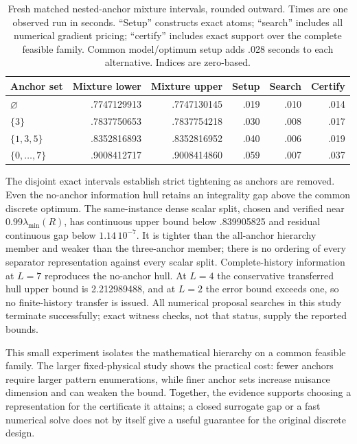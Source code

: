 \begin{table}[htbp]
\centering\small
\caption{Fresh matched nested-anchor mixture intervals, rounded outward.
Times are one observed run in seconds. ``Setup'' constructs exact atoms;
``search'' includes all numerical gradient pricing; ``certify'' includes exact
support over the complete feasible family. Common model/optimum setup adds
.028 seconds to each alternative. Indices are zero-based.}
\label{tab:nested-fresh}
\begin{tabular}{lrrrrr}
\toprule
Anchor set & Mixture lower & Mixture upper & Setup & Search & Certify\\
\midrule
$\varnothing$ & .7747129913 & .7747130145 & .019 & .010 & .014\\
$\{3\}$ & .7837750653 & .7837754218 & .030 & .008 & .017\\
$\{1,3,5\}$ & .8352816893 & .8352816952 & .040 & .006 & .019\\
$\{0,\ldots,7\}$ & .9008412717 & .9008414860 & .059 & .007 & .037\\
\bottomrule
\end{tabular}
\end{table}

The disjoint exact intervals establish strict tightening as anchors are removed.
Even the no-anchor information hull retains an integrality gap above the
common discrete optimum. The same-instance dense scalar split, chosen and
verified near $0.99\lambda_{\min}(R)$, has continuous upper bound below
.839905825 and residual continuous gap below $1.14\,10^{-7}$. It is tighter
than the all-anchor hierarchy member and weaker than the three-anchor member;
there is no ordering of every separator representation against every scalar
split. Complete-history information at $L=7$ reproduces the no-anchor hull.
At $L=4$ the conservative transferred hull upper bound is 2.212989488, and at
$L=2$ the error bound exceeds one, so no finite-history transfer is issued.
All numerical proposal searches in this study terminate successfully;
exact witness checks, not that status, supply the reported bounds.

This small experiment isolates the mathematical hierarchy on a common
feasible family. The larger fixed-physical study shows the practical cost:
fewer anchors require larger pattern enumerations, while finer anchor sets
increase nuisance dimension and can weaken the bound. Together, the evidence
supports choosing a representation for the certificate it attains; a closed
surrogate gap or a fast numerical solve does not by itself give a useful
guarantee for the original discrete design.
